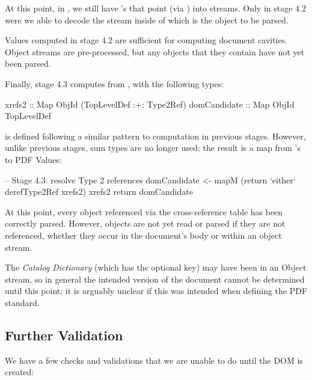 At this point, in , we still have 's that point
(via ) into  streams.
%
Only in stage 4.2 were we able to decode the stream inside of
which is the object to be parsed.


Values computed in stage 4.2 are sufficient for computing document cavities.
%
Object streams are pre-processed, but any objects that they contain have not yet been parsed.

Finally, stage 4.3 computes  from , with the following types:
\begin{codeNoExecute}
  xrefs2       :: Map ObjId (TopLevelDef :+: Type2Ref) 
  domCandidate :: Map ObjId TopLevelDef
\end{codeNoExecute}
 is defined following a similar pattern to computation in previous stages.
%
However, unlike previous stages, sum types are no longer used; the result is a map from  's to PDF Values:
\begin{code}
    -- Stage 4.3: resolve Type 2 references
    domCandidate <- mapM
                     (return `either` derefType2Ref xrefs2)
                     xrefs2
    return domCandidate
\end{code}

At this point, every object referenced via the cross-reference table has been correctly parsed.
%
However, objects are not yet read or parsed if they are not referenced, whether they occur in the document's body or within an object stream.

The \emph{Catalog Dictionary} (which has the optional
 key) may have been in an Object stream, so in general the intended version of the document cannot be determined until this point;
%
it is arguably unclear if this was intended when defining the PDF standard.

\subsection{Further Validation}
\label{sec:validating}


We have a few checks and validations that we are unable to do until
the DOM is created:

